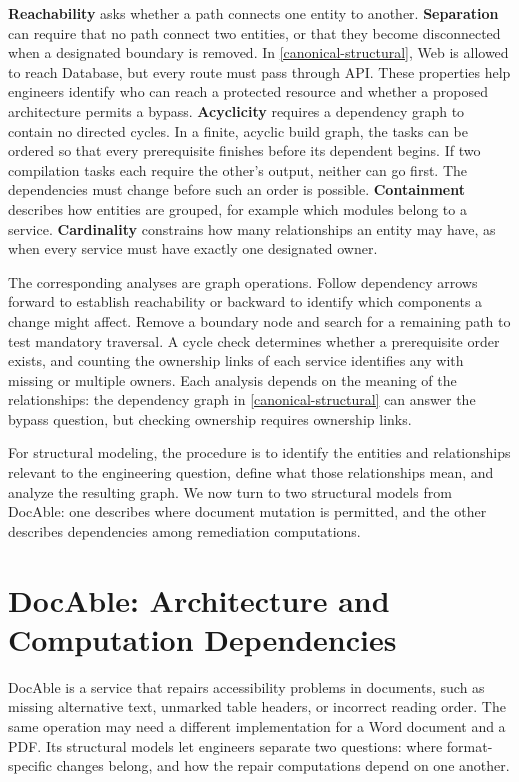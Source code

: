 \textbf{Reachability} asks whether a path connects one entity to another. \textbf{Separation} can require that no path connect two entities, or that they become disconnected when a designated boundary is removed. In \autoref{canonical-structural}, Web is allowed to reach Database, but every route must pass through API. These properties help engineers identify who can reach a protected resource and whether a proposed architecture permits a bypass. \textbf{Acyclicity} requires a dependency graph to contain no directed cycles. In a finite, acyclic build graph, the tasks can be ordered so that every prerequisite finishes before its dependent begins. If two compilation tasks each require the other's output, neither can go first. The dependencies must change before such an order is possible. \textbf{Containment} describes how entities are grouped, for example which modules belong to a service. \textbf{Cardinality} constrains how many relationships an entity may have, as when every service must have exactly one designated owner.

The corresponding analyses are graph operations. Follow dependency arrows forward to establish reachability or backward to identify which components a change might affect. Remove a boundary node and search for a remaining path to test mandatory traversal. A cycle check determines whether a prerequisite order exists, and counting the ownership links of each service identifies any with missing or multiple owners. Each analysis depends on the meaning of the relationships: the dependency graph in \autoref{canonical-structural} can answer the bypass question, but checking ownership requires ownership links.

For structural modeling, the procedure is to identify the entities and relationships relevant to the engineering question, define what those relationships mean, and analyze the resulting graph. We now turn to two structural models from DocAble: one describes where document mutation is permitted, and the other describes dependencies among remediation computations.

\section{DocAble: Architecture and Computation Dependencies}\label{heading:docable-architecture-and-computation-dependencies}

DocAble is a service that repairs accessibility problems in documents, such as missing alternative text, unmarked table headers, or incorrect reading order. The same operation may need a different implementation for a Word document and a PDF. Its structural models let engineers separate two questions: where format-specific changes belong, and how the repair computations depend on one another.

